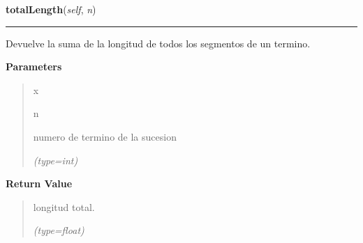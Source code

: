 \hspace{.8\funcindent}\begin{boxedminipage}{\funcwidth}

    \raggedright \textbf{totalLength}(\textit{self}, \textit{n})

    \vspace{-1.5ex}

    \rule{\textwidth}{0.5\fboxrule}
\setlength{\parskip}{2ex}
    Devuelve la suma de la longitud de todos los segmentos de un termino.

\setlength{\parskip}{1ex}
      \textbf{Parameters}
      \vspace{-1ex}

      \begin{quote}
        \begin{Ventry}{x}

          \item[n]

          numero de termino de la sucesion

            {\it (type=int)}

        \end{Ventry}

      \end{quote}

      \textbf{Return Value}
    \vspace{-1ex}

      \begin{quote}
      longitud total.

      {\it (type=float)}

      \end{quote}

    \end{boxedminipage}

    \label{FractalZE:cantor:Cantor:lindenmayer}

    \vspace{0.5ex}

